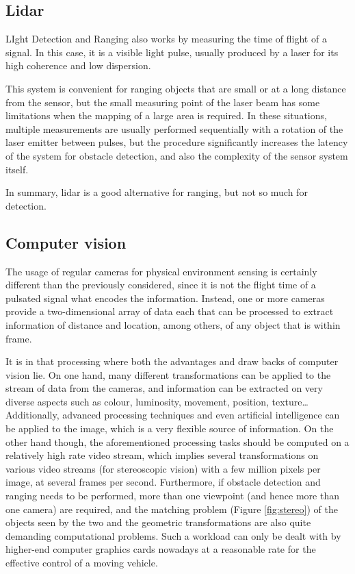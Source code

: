 \subsection{Lidar}

LIght Detection and Ranging also works by measuring the time of flight of a signal.
In this case, it is a visible light pulse, usually produced by a laser for its high coherence and low dispersion.

This system is convenient for ranging objects that are small or at a long distance from the sensor, but the small measuring point of the laser beam has some limitations when the mapping of a large area is required.
In these situations, multiple measurements are usually performed sequentially with a rotation of the laser emitter between pulses, but the procedure significantly increases the latency of the system for obstacle detection, and also the complexity of the sensor system itself.

In summary, lidar is a good alternative for ranging, but not so much for detection.

\subsection{Computer vision}

The usage of regular cameras for physical environment sensing is certainly different than the previously considered, since it is not the flight time of a pulsated signal what encodes the information.
Instead, one or more cameras provide a two-dimensional array of data each that can be processed to extract information of distance and location, among others, of any object that is within frame.

It is in that processing where both the advantages and draw backs of computer vision lie.
On one hand, many different transformations can be applied to the stream of data from the cameras, and information can be extracted on very diverse aspects such as colour, luminosity, movement, position, texture\dots \cite{ballard1982} 
Additionally, advanced processing techniques and even artificial intelligence can be applied to the image, which is a very flexible source of information.
On the other hand though, the aforementioned processing tasks should be computed on a relatively high rate video stream, which implies several transformations on various video streams (for stereoscopic vision) with a few million pixels per image, at several frames per second.
Furthermore, if obstacle detection and ranging needs to be performed, more than one viewpoint (and hence more than one camera) are required, and the matching problem (Figure \ref{fig:stereo}) of the objects seen by the two and the geometric transformations are also quite demanding computational problems.
Such a workload can only be dealt with by higher-end computer graphics cards nowadays at a reasonable rate for the effective control of a moving vehicle.

